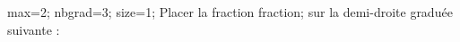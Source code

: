 \documentclass[exercice]{thedocument}%
\begin{document}
%
\!max=2;%
\!nbgrad=3;%
\!size=1;%
Placer la fraction \<fraction; sur la demi-droite graduée
suivante :\vskip20pt\noindent
{}
\end{document}
